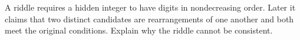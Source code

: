 A riddle requires a hidden integer to have digits in nondecreasing order. Later it claims that two distinct candidates are rearrangements of one another and both meet the original conditions. Explain why the riddle cannot be consistent.
